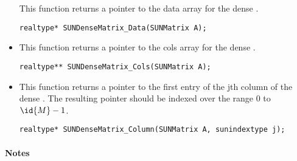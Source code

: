 \begin{itemize}
  This function returns a pointer to the data array for the dense .
 
  \verb|realtype* SUNDenseMatrix_Data(SUNMatrix A);|


\item {}

  This function returns a pointer to the cols array for the dense .
 
  \verb|realtype** SUNDenseMatrix_Cols(SUNMatrix A);|


\item {}

  This function returns a pointer to the first entry of the jth
  column of the dense .  The resulting pointer should
  be indexed over the range $0$ to $\id{M}-1$.
 
  \verb|realtype* SUNDenseMatrix_Column(SUNMatrix A, sunindextype j);|

\end{itemize}
\paragraph{\bf Notes}                                                      
           
